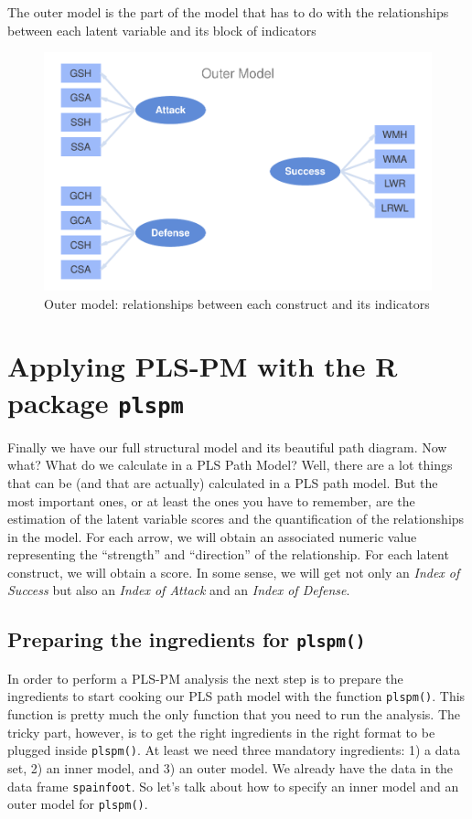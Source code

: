 \documentclass[12pt]{book}\usepackage{graphicx, color}
\newenvironment{knitrout}{}{} %
\newcommand{\plspm}{\texttt{plspm}}
\newcommand{\fplspm}{\texttt{plspm()}}
\newcommand{\code}[1]{\texttt{#1}}
\begin{document}
The outer model is the part of the model that has to do with the relationships between each latent variable and its block of indicators
\begin{knitrout}
\color{fgcolor}\begin{figure}[h]


{\centering \includegraphics[width=.85\linewidth,height=.45\linewidth]{figure/spainfoot_outer_model_diag} 

}

\caption[Outer model]{Outer model: relationships between each construct and its indicators\label{fig:spainfoot_outer_model_diag}}
\end{figure}


\end{knitrout}




\section{Applying PLS-PM with the R package \plspm{}}
Finally we have our full structural model and its beautiful path diagram. Now what? What do we calculate in a PLS Path Model? Well, there are a lot things that can be (and that are actually) calculated in a PLS path model. But the most important ones, or at least the ones you have to remember, are the estimation of the latent variable scores and the quantification of the relationships in the model. For each arrow, we will obtain an associated numeric value representing the ``strength'' and ``direction'' of the relationship. For each latent construct, we will obtain a score. In some sense, we will get not only an \textit{Index of Success} but also an \textit{Index of Attack} and an \textit{Index of Defense}.


\subsection{Preparing the ingredients for \fplspm{}}
In order to perform a PLS-PM analysis the next step is to prepare the ingredients to start cooking our PLS path model with the function \fplspm{}. This function is pretty much the only function that you need to run the analysis. The tricky part, however, is to get the right ingredients in the right format to be plugged inside \fplspm{}. At least we need three mandatory ingredients: 1) a data set, 2) an inner model, and 3) an outer model. We already have the data in the data frame \code{spainfoot}. So let's talk about how to specify an inner model and an outer model for \fplspm{}.
\end{document}
